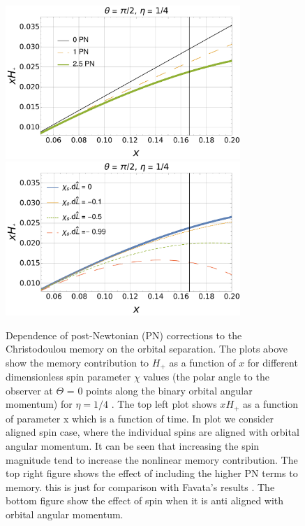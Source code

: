\documentclass[twocolumn,showpacs,aps,prd,nobibnotes,floatfix]{revtex4-1}
\begin{document}
\begin{widetext}
\begin{figure}
	\includegraphics[width=3.5in]{../plots/PNmemoryFavata.pdf}
	\includegraphics[width=3.5in]{../plots/PNmemorycontributionHpAntiAlginedSpin.pdf}
	\caption{Dependence of post-Newtonian (PN) corrections to the Christodoulou memory on the orbital separation. The plots above show the memory contribution to $H_+$  as a function of $x$ for different dimensionless spin parameter $\chi$ values (the polar angle to the observer at $\Theta$ = 0 points along the binary orbital angular momentum) for $\eta=1/4 $ . The top left plot shows $x H_+$ as a function of parameter x which is a function of time. In plot we consider aligned spin case, where the individual spins are aligned with orbital angular momentum. It can be seen that increasing the spin magnitude tend to increase the nonlinear memory contribution. The top right figure shows the effect of including the higher PN terms to memory. this is just for comparison with Favata's results \cite{Favata2009}. The bottom figure show the effect of spin when it is anti aligned with orbital angular momentum.   
		}
	\label{fig:HpVsX}
\end{figure}
\end{widetext}
\end{document}
